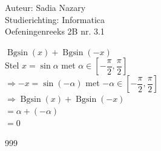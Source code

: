 \documentclass[a4paper]{article}
\begin{document}
  
\noindent \large Auteur: Sadia Nazary       \\
\noindent \large Studierichting: Informatica \\
\noindent \large Oefeningenreeks 2B nr. 3.1 \\

\medskip

\normalsize

$ \operatorname{Bgsin}(x) + \operatorname{Bgsin}(-x) $ \\

Stel $ x = \sin \alpha $ met $ \alpha \in \left[-\dfrac{\pi}{2}, \dfrac{\pi}{2}\right] $ \\

$\Rightarrow -x = \sin(-\alpha) $ met $ -\alpha \in \left[-\dfrac{\pi}{2}, \dfrac{\pi}{2}\right] $ \\

$ \Rightarrow \operatorname{Bgsin}(x) + \operatorname{Bgsin}(-x) $ \\

$ = \alpha + (-\alpha) $ \\

$ = 0 $ \\

\begin{thebibliography}{999}
\end{thebibliography}
\end{document}
